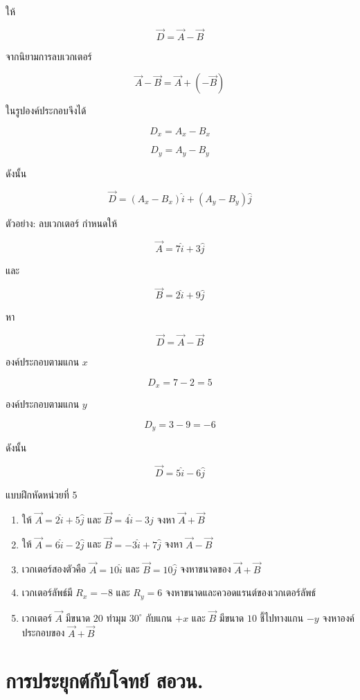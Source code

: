 \documentclass[12pt,a4paper]{report}
\begin{document}
ให้

\[
\vec{D}=\vec{A}-\vec{B}
\]

จากนิยามการลบเวกเตอร์

\[
\vec{A}-\vec{B}=\vec{A}+(-\vec{B})
\]

ในรูปองค์ประกอบจึงได้

\[
D_x=A_x-B_x
\]

\[
D_y=A_y-B_y
\]

ดังนั้น

\[
\vec{D}=(A_x-B_x)\hat{i}+(A_y-B_y)\hat{j}
\]

\begin{examplebox}{ตัวอย่าง: ลบเวกเตอร์}
กำหนดให้

\[
\vec{A}=7\hat{i}+3\hat{j}
\]

และ

\[
\vec{B}=2\hat{i}+9\hat{j}
\]

หา

\[
\vec{D}=\vec{A}-\vec{B}
\]

องค์ประกอบตามแกน $x$

\[
D_x=7-2=5
\]

องค์ประกอบตามแกน $y$

\[
D_y=3-9=-6
\]

ดังนั้น

\[
\vec{D}=5\hat{i}-6\hat{j}
\]
\end{examplebox}

\begin{exercisebox}{แบบฝึกหัดหน่วยที่ 5}
\begin{enumerate}
    \item ให้ $\vec{A}=2\hat{i}+5\hat{j}$ และ $\vec{B}=4\hat{i}-3\hat{j}$ จงหา $\vec{A}+\vec{B}$
    \item ให้ $\vec{A}=6\hat{i}-2\hat{j}$ และ $\vec{B}=-3\hat{i}+7\hat{j}$ จงหา $\vec{A}-\vec{B}$
    \item เวกเตอร์สองตัวคือ $\vec{A}=10\hat{i}$ และ $\vec{B}=10\hat{j}$ จงหาขนาดของ $\vec{A}+\vec{B}$
    \item เวกเตอร์ลัพธ์มี $R_x=-8$ และ $R_y=6$ จงหาขนาดและควอดแรนต์ของเวกเตอร์ลัพธ์
    \item เวกเตอร์ $\vec{A}$ มีขนาด $20$ ทำมุม $30^\circ$ กับแกน $+x$ และ $\vec{B}$ มีขนาด $10$ ชี้ไปทางแกน $-y$ จงหาองค์ประกอบของ $\vec{A}+\vec{B}$
\end{enumerate}
\end{exercisebox}

\section{การประยุกต์กับโจทย์ สอวน.}
\end{document}

